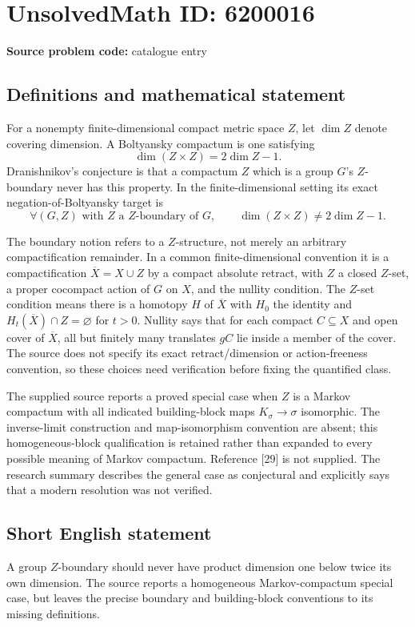 \documentclass[11pt]{article}
\begin{document}
\section*{UnsolvedMath ID: 6200016}
\textbf{Source problem code:} catalogue entry
\subsection{Definitions and mathematical statement}
For a nonempty finite-dimensional compact metric space \(Z\), let \(\dim Z\) denote covering dimension. A Boltyansky compactum is one satisfying
\[
\dim(Z\times Z)=2\dim Z-1.
\]
Dranishnikov's conjecture is that a compactum \(Z\) which is a group \(G\)'s \(Z\)-boundary never has this property. In the finite-dimensional setting its exact negation-of-Boltyansky target is
\[
\forall(G,Z)\text{ with }Z\text{ a }Z\text{-boundary of }G,
\qquad \dim(Z\times Z)\ne2\dim Z-1.
\]

The boundary notion refers to a \(Z\)-structure, not merely an arbitrary compactification remainder. In a common finite-dimensional convention it is a compactification \(\overline X=X\cup Z\) by a compact absolute retract, with \(Z\) a closed \(Z\)-set, a proper cocompact action of \(G\) on \(X\), and the nullity condition. The \(Z\)-set condition means there is a homotopy \(H\) of \(\overline X\) with \(H_0\) the identity and \(H_t(\overline X)\cap Z=\varnothing\) for \(t>0\). Nullity says that for each compact \(C\subseteq X\) and open cover of \(\overline X\), all but finitely many translates \(gC\) lie inside a member of the cover. The source does not specify its exact retract/dimension or action-freeness convention, so these choices need verification before fixing the quantified class.

The supplied source reports a proved special case when \(Z\) is a Markov compactum with all indicated building-block maps \(K_\sigma\to\sigma\) isomorphic. The inverse-limit construction and map-isomorphism convention are absent; this homogeneous-block qualification is retained rather than expanded to every possible meaning of Markov compactum. Reference [29] is not supplied. The research summary describes the general case as conjectural and explicitly says that a modern resolution was not verified.
\subsection{Short English statement}
A group \(Z\)-boundary should never have product dimension one below twice its own dimension. The source reports a homogeneous Markov-compactum special case, but leaves the precise boundary and building-block conventions to its missing definitions.
\end{document}
